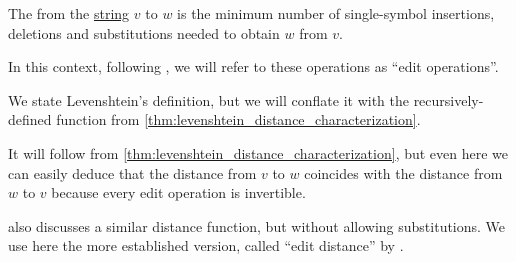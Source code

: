 \begin{definition}\label{def:levenshtein_distance}
  The  from the \hyperref[def:formal_language/string]{string} \( v \) to \( w \) is the minimum number of single-symbol insertions, deletions and substitutions needed to obtain \( w \) from \( v \).

  In this context, following \textcite[168]{WagnerFischer1974LevenshteinDistance}, we will refer to these operations as \enquote{edit operations}.
\end{definition}
\begin{comments}
  \item We state Levenshtein's definition, but we will conflate it with the recursively-defined function from \cref{thm:levenshtein_distance_characterization}.

  \item It will follow from \cref{thm:levenshtein_distance_characterization}, but even here we can easily deduce that the distance from \( v \) to \( w \) coincides with the distance from \( w \) to \( v \) because every edit operation is invertible.

  \item \Textcite[2]{Левенштейн1965ДвоичныеКоды} also discusses a similar distance function, but without allowing substitutions. We use here the more established version, called \enquote{edit distance} by \textcite[168]{WagnerFischer1974LevenshteinDistance}.
\end{comments}

